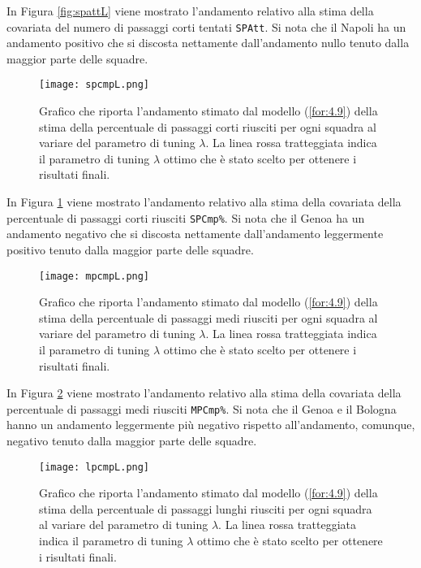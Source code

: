 In Figura \ref{fig:spattL} viene mostrato l'andamento relativo alla stima della covariata del numero di passaggi corti tentati \texttt{SPAtt}. Si nota che il Napoli ha un andamento positivo che si discosta nettamente dall'andamento nullo tenuto dalla maggior parte delle squadre.

\begin{figure}[htbp]
	\begin{center}
		\texttt{[image: spcmpL.png]}
		\caption{Grafico che riporta l'andamento stimato dal modello (\ref{for:4.9}) della stima della percentuale di passaggi corti riusciti per ogni squadra al variare del parametro di tuning $\lambda$. La linea rossa tratteggiata indica il parametro di tuning $\lambda$ ottimo che è stato scelto per ottenere i risultati finali.} \label{fig:spcmpL}
	\end{center}
\end{figure}

In Figura \ref{fig:spcmpL} viene mostrato l'andamento relativo alla stima della covariata della percentuale di passaggi corti riusciti \texttt{SPCmp\%}. Si nota che il Genoa ha un andamento negativo che si discosta nettamente dall'andamento leggermente positivo tenuto dalla maggior parte delle squadre.

\begin{figure}[htbp]
	\begin{center}
		\texttt{[image: mpcmpL.png]}
		\caption{Grafico che riporta l'andamento stimato dal modello (\ref{for:4.9}) della stima della percentuale di passaggi medi riusciti per ogni squadra al variare del parametro di tuning $\lambda$. La linea rossa tratteggiata indica il parametro di tuning $\lambda$ ottimo che è stato scelto per ottenere i risultati finali.} \label{fig:mpcmpL}
	\end{center}
\end{figure}

In Figura \ref{fig:mpcmpL} viene mostrato l'andamento relativo alla stima della covariata della percentuale di passaggi medi riusciti \texttt{MPCmp\%}. Si nota che il Genoa e il Bologna hanno un andamento leggermente più negativo rispetto all’andamento, comunque, negativo tenuto dalla maggior parte delle squadre.

\begin{figure}[htbp]
	\begin{center}
		\texttt{[image: lpcmpL.png]}
		\caption{Grafico che riporta l'andamento stimato dal modello (\ref{for:4.9}) della stima della percentuale di passaggi lunghi riusciti per ogni squadra al variare del parametro di tuning $\lambda$. La linea rossa tratteggiata indica il parametro di tuning $\lambda$ ottimo che è stato scelto per ottenere i risultati finali.} \label{fig:lpcmpL}
	\end{center}
\end{figure}

